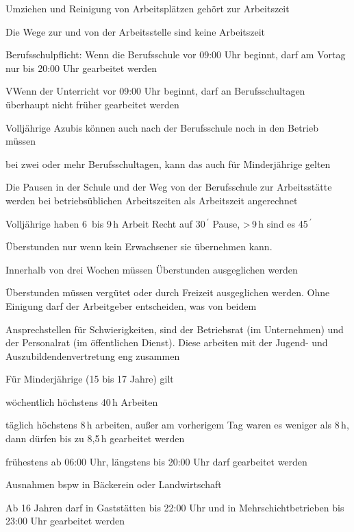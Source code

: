 \begin{myitemize}
    \item Umziehen und Reinigung von Arbeitsplätzen gehört zur Arbeitszeit
    \item Die Wege zur und von der Arbeitsstelle sind keine Arbeitszeit
    \item Berufsschulpflicht: Wenn die Berufsschule vor 09:00 Uhr beginnt, darf am Vortag nur bis 20:00 Uhr gearbeitet werden
    \item VWenn der Unterricht vor 09:00 Uhr beginnt, darf an Berufsschultagen überhaupt nicht früher gearbeitet werden
    \item Volljährige Azubis können auch nach der Berufsschule noch in den Betrieb müssen
    \item bei zwei oder mehr Berufsschultagen, kann das auch für Minderjährige gelten
    \item Die Pausen in der Schule und der Weg von der Berufsschule zur Arbeitsstätte werden bei betriebsüblichen Arbeitszeiten als Arbeitszeit angerechnet
    \item Volljährige haben 6\, bis 9\,h Arbeit Recht auf 30$\,^{\prime}$ Pause, >\,9\,h sind es 45$\,^{\prime}$
    \item Überstunden nur wenn kein Erwachsener sie übernehmen kann.
    \item Innerhalb von drei Wochen müssen Überstunden ausgeglichen werden
    \item Überstunden müssen vergütet oder durch Freizeit ausgeglichen werden. Ohne Einigung darf der Arbeitgeber entscheiden, was von beidem
    \item Ansprechstellen für Schwierigkeiten, sind der Betriebsrat (im Unternehmen) und der Personalrat (im öffentlichen Dienst). Diese arbeiten mit der Jugend- und Auszubildendenvertretung eng zusammen    
    \item Für Minderjährige (15 bis 17 Jahre) gilt
    \begin{myitemize}
        \item wöchentlich höchstens 40\,h Arbeiten
        \item täglich höchstens 8\,h arbeiten, außer am vorherigem Tag waren es weniger als 8\,h, dann dürfen bis zu 8,5\,h gearbeitet werden
        \item frühestens ab 06:00 Uhr, längstens bis 20:00 Uhr darf gearbeitet werden 
        \item Ausnahmen \gls{bspw} in Bäckerein oder Landwirtschaft
        \item Ab 16 Jahren darf in Gaststätten bis 22:00 Uhr und in Mehrschichtbetrieben bis 23:00 Uhr gearbeitet werden

\end{myitemize}
\end{myitemize}
